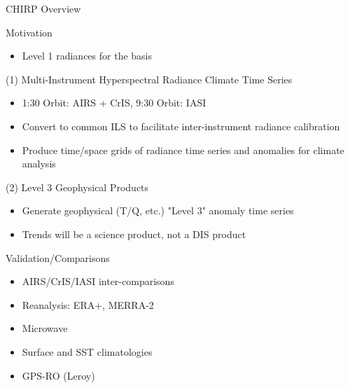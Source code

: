 \documentclass[10pt,t]{beamer}
\begin{document}
\begin{frame}[label={sec:org90e619f},shrink=20]{CHIRP Overview}
\vspace{-0.1in}
\begin{block}{Motivation}
\begin{itemize}
\item Level 1 radiances for the basis
\end{itemize}
\end{block}


\begin{block}{(1) Multi-Instrument Hyperspectral Radiance Climate Time Series}
\begin{itemize}
\item 1:30 Orbit: AIRS + CrIS, 9:30 Orbit: IASI
\item Convert to common ILS to facilitate inter-instrument radiance calibration
\item Produce time/space grids of radiance time series and anomalies for climate analysis
\end{itemize}
\end{block}

\begin{block}{(2) Level 3 Geophysical Products}
\begin{itemize}
\item Generate geophysical (T/Q, etc.) "Level 3" anomaly time series
\item Trends will be a science product, not a DIS product
\end{itemize}
\end{block}

\begin{block}{Validation/Comparisons}
\begin{itemize}
\item AIRS/CrIS/IASI inter-comparisons
\item Reanalysis: ERA+, MERRA-2
\item Microwave
\item Surface and SST climatologies
\item GPS-RO (Leroy)
\end{itemize}
\end{block}
\end{frame}
\end{document}
